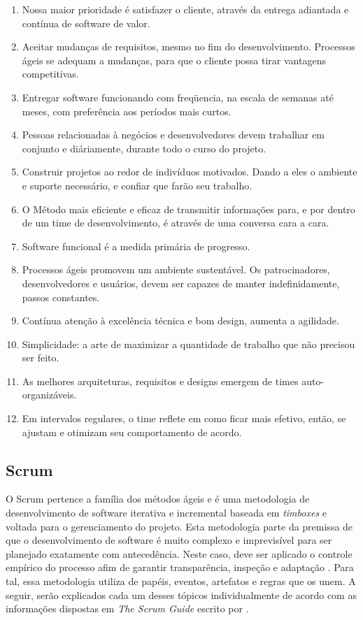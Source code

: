 \begin{enumerate}
    \item Nossa maior prioridade é satisfazer o cliente, através da entrega adiantada
    e contínua de software de valor.
    \item Aceitar mudanças de requisitos, mesmo no fim do desenvolvimento. Processos
    ágeis se adequam a mudanças, para que o cliente possa tirar vantagens competitivas.
    \item Entregar software funcionando com freqüencia, na escala de semanas até meses,
    com preferência aos períodos mais curtos.
    \item Pessoas relacionadas à negócios e desenvolvedores devem trabalhar em conjunto
    e diáriamente, durante todo o curso do projeto.
    \item Construir projetos ao redor de indivíduos motivados. Dando a eles o ambiente e
    suporte necessário, e confiar que farão seu trabalho.
    \item O Método mais eficiente e eficaz de transmitir informações para, e por dentro
    de um time de desenvolvimento, é através de uma conversa cara a cara.
    \item Software funcional é a medida primária de progresso.
    \item Processos ágeis promovem um ambiente sustentável. Os patrocinadores,
    desenvolvedores e usuários, devem ser capazes de manter indefinidamente, passos
    constantes.
    \item Contínua atenção à excelência técnica e bom design, aumenta a agilidade.
    \item Simplicidade: a arte de maximizar a quantidade de trabalho que não precisou ser
    feito.
    \item As melhores arquiteturas, requisitos e designs emergem de times auto-organizáveis.
    \item Em intervalos regulares, o time reflete em como ficar mais efetivo, então, se
    ajustam e otimizam seu comportamento de acordo.
\end{enumerate}

\subsection{Scrum}

O Scrum pertence a família dos métodos ágeis e é uma metodologia de desenvolvimento
de software iterativa e incremental baseada em \textit{timboxes} e voltada para o
gerenciamento do projeto. Esta metodologia parte da premissa de que o desenvolvimento
de software é muito complexo e imprevisível para ser planejado exatamente com
antecedência. Neste caso, deve ser aplicado o controle empírico do processo afim de
garantir transparência, inspeção e adaptação \cite{Mahnic2005}. Para tal, essa
metodologia utiliza de papéis, eventos, artefatos e regras que os unem. A seguir,
serão explicados cada um desses tópicos individualmente de acordo com as informações
dispostas em \textit{The Scrum Guide} escrito por .

